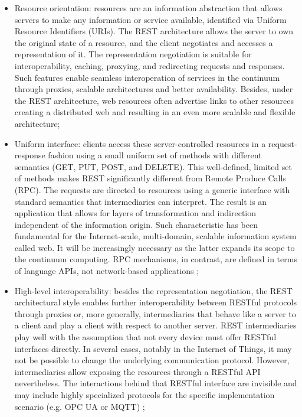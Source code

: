 \begin{itemize}
    \item Resource orientation: resources are an information abstraction that allows servers to make any information or service available, identified via Uniform Resource Identifiers (URIs). The REST architecture allows the server to own the original state of a resource, and the client negotiates and accesses a representation of it. The representation negotiation is suitable for interoperability, caching, proxying, and redirecting requests and responses. Such features enable seamless interoperation of services in the continuum through proxies, scalable architectures and better availability. Besides, under the REST architecture, web resources often advertise links to other resources creating a distributed web and resulting in an even more scalable and flexible architecture;
    \item Uniform interface: clients access these server-controlled resources in a request-response fashion using a small uniform set of methods with different semantics (GET, PUT, POST, and DELETE). This well-defined, limited set of methods makes REST significantly different from Remote Produce Calls (RPC). The requests are directed to resources using a generic interface with standard semantics that intermediaries can interpret. The result is an application that allows for layers of transformation and indirection independent of the information origin. Such characteristic has been fundamental for the Internet-scale, multi-domain, scalable information system called web. It will be increasingly necessary as the latter expands its scope to the continuum computing. RPC mechanisms, in contrast, are defined in terms of language APIs, not network-based applications \cite{rest};
    \item High-level interoperability: besides the representation negotiation, the REST architectural style enables further interoperability between RESTful protocols through proxies or, more generally, intermediaries that behave like a server to a client and play a client with respect to another server. REST intermediaries play well with the assumption that not every device must offer RESTful interfaces directly. In several cases, notably in the Internet of Things, it may not be possible to change the underlying communication protocol. However, intermediaries allow exposing the resources through a RESTful API nevertheless. The interactions behind that RESTful interface are invisible and may include highly specialized protocols for the specific implementation scenario (e.g. OPC UA or MQTT) \cite{guinard2010resource};

\end{itemize}

